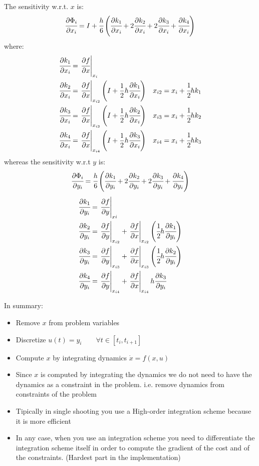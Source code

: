 \begin{enumerate}
\begin{itemize}
The sensitivity w.r.t. $x$ is:
\[\cfrac{\partial\Phi_i}{\partial x_i}=I+\cfrac{h}{6}\left(\cfrac{\partial k_1}{\partial x_i} + 2 \cfrac{\partial k_2}{\partial x_i} + 2\cfrac{\partial k_3}{\partial x_i} + \cfrac{\partial k_4}{\partial x_i}\right)\]
where:
\begin{align*}
\cfrac{\partial k_1}{\partial x_i} &= \left.\cfrac{\partial f}{\partial x}\right|_{x_i}&\\
\cfrac{\partial k_2}{\partial x_i} &= \left.\cfrac{\partial f}{\partial x}\right|_{x_{i2}}\left(I + \frac{1}{2}h\cfrac{\partial k_1}{\partial x_i}\right)& x_{i2} = x_i + \cfrac{1}{2}hk_1\\
\cfrac{\partial k_3}{\partial x_i} &= \left.\cfrac{\partial f}{\partial x}\right|_{x_{i3}}\left(I + \frac{1}{2}h\cfrac{\partial k_2}{\partial x_i}\right)& x_{i3} = x_i + \cfrac{1}{2}hk_2\\
\cfrac{\partial k_4}{\partial x_i} &= \left.\cfrac{\partial f}{\partial x}\right|_{x_{i4}}\left(I + \frac{1}{2}h\cfrac{\partial k_3}{\partial x_i}\right)& x_{i4} = x_i + \cfrac{1}{2}hk_3\\
\end{align*}
whereas the sensitivity w.r.t $y$ is:
\[\cfrac{\partial\Phi_i}{\partial y_i} = \cfrac{h}{6}\left(\cfrac{\partial k_1}{\partial y_i} + 2\cfrac{\partial k_2}{\partial y_i} + 2\cfrac{\partial k_3}{\partial y_i} + \cfrac{\partial k_4}{\partial y_i}\right)\]
\begin{align*}
\cfrac{\partial k_1}{\partial y_i}&=\left.\cfrac{\partial f}{\partial y}\right|_{xi}\\
\cfrac{\partial k_2}{\partial y_i}&=\left.\cfrac{\partial f}{\partial y}\right|_{x_{i2}} + \left.\cfrac{\partial f}{\partial x}\right|_{x_{i2}}\left(\cfrac{1}{2}h\cfrac{\partial k_1}{\partial y_i}\right)\\
\cfrac{\partial k_3}{\partial y_i}&=\left.\cfrac{\partial f}{\partial y}\right|_{x_{i3}} + \left.\cfrac{\partial f}{\partial x}\right|_{x_{i3}}\left(\cfrac{1}{2}h\cfrac{\partial k_2}{\partial y_i}\right)\\
\cfrac{\partial k_4}{\partial y_i}&=\left.\cfrac{\partial f}{\partial y}\right|_{x_{i4}} + \left.\cfrac{\partial f}{\partial x}\right|_{x_{i4}}h\cfrac{\partial k_3}{\partial y_i}
\end{align*}
\end{itemize}
\end{enumerate}


In summary:
\begin{itemize}
\item Remove $x$ from problem variables
\item Discretize $u(t) = y_i \qquad \forall t \in [t_i, t_{i+1}]$
\item Compute $x$ by integrating dynamics $\dot{x} = f(x,u)$
\item Since $x$ is computed by integrating the dynamics we do not need to have the dynamics as a constraint in the problem. i.e. remove dynamics from constraints of the problem
\item Tipically in single shooting you use a High-order integration scheme because it is more efficient
\item In any case, when you use an integration scheme you need to differentiate the integration scheme itself in order to compute the gradient of the cost and of the constraints. (Hardest part in the implementation)
\end{itemize}


